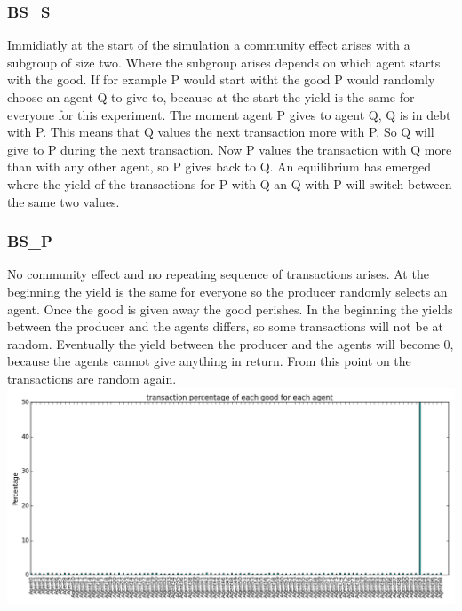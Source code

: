 \documentclass[twoside,openright]{uva-bachelor-thesis}
\begin{document}
\subsubsection{BS\_S}
Immidiatly at the start of the simulation a community effect arises with a subgroup of size two. Where the subgroup arises depends on which agent starts with the good. If for example P would start witht the good P would randomly choose an agent Q to give to, because at the start the yield is the same for everyone for this experiment. The moment agent P gives to agent Q, Q is in debt with P. This means that Q values the next transaction more with P. So Q will give to P during the next transaction. Now P values the transaction with Q more than with any other agent, so P gives back to Q. An equilibrium has emerged where the yield of the transactions for P with Q an Q with P will switch between the same two values. 

\subsubsection{BS\_P}
No community effect and no repeating sequence of transactions arises. At the beginning the yield is the same for everyone so the producer randomly selects an agent. Once the good is given away the good perishes. In the beginning the yields between the producer and the agents differs, so some transactions will not be at random. Eventually the yield between the producer and the agents will become 0, because the agents cannot give anything in return. From this point on the transactions are random again.
\includegraphics[scale=0.4]{GR_BS_P/4000transactions}
\end{document}
